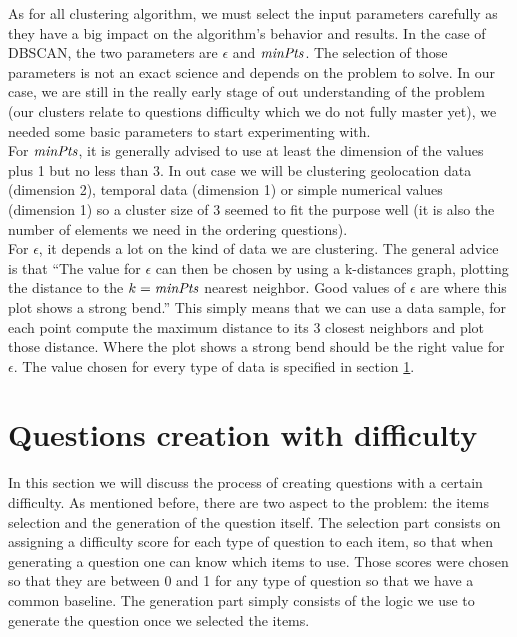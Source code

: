 As for all clustering algorithm, we must select the input parameters carefully as they have a big impact on the algorithm's behavior and results. In the case of DBSCAN, the two parameters are $\epsilon$ and $\mathit{minPts}$. The selection of those parameters is not an exact science and depends on the problem to solve. In our case, we are still in the really early stage of out understanding of the problem (our clusters relate to questions difficulty which we do not fully master yet), we needed some basic parameters to start experimenting with.\\
For $\mathit{minPts}$, it is generally advised to use at least the dimension of the values plus 1 but no less than 3\cite{dbscan}. In out case we will be clustering geolocation data (dimension 2), temporal data (dimension 1) or simple numerical values (dimension 1) so a cluster size of 3 seemed to fit the purpose well (it is also the number of elements we need in the ordering questions).\\
For $\epsilon$, it depends a lot on the kind of data we are clustering. The general advice is that ``The value for $\epsilon$ can then be chosen by using a k-distances graph, plotting the distance to the $k = \mathit{minPts}$ nearest neighbor. Good values of $\epsilon$ are where this plot shows a strong bend.''\cite{dbscan} This simply means that we can use a data sample, for each point compute the maximum distance to its 3 closest neighbors and plot those distance. Where the plot shows a strong bend should be the right value for $\epsilon$. The value chosen for every type of data is specified in section \ref{sec:qdiff}.

\section{Questions creation with difficulty}\label{sec:qdiff}
In this section we will discuss the process of creating questions with a certain difficulty. As mentioned before, there are two aspect to the problem: the items selection and the generation of the question itself. The selection part consists on assigning a difficulty score for each type of question to each item, so that when generating a question one can know which items to use. Those scores were chosen so that they are between 0 and 1 for any type of question so that we have a common baseline. The generation part simply consists of the logic we use to generate the question once we selected the items.
